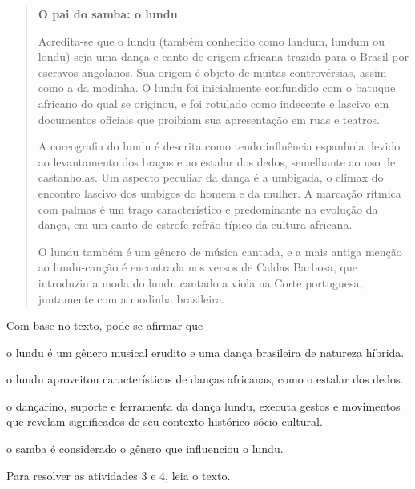 \begin{quote}
\textbf{O pai do samba: o lundu}

Acredita-se que o lundu (também conhecido como landum, lundum ou londu) seja uma dança e 
canto de origem africana trazida para o Brasil por escravos angolanos. Sua origem é 
objeto de muitas controvérsias, assim como a da modinha. O lundu foi inicialmente 
confundido com o batuque africano do qual se originou, e foi rotulado como indecente e 
lascivo em documentos oficiais que proibiam sua apresentação em ruas e teatros.

A coreografia do lundu é descrita como tendo influência espanhola devido ao levantamento 
dos braços e ao estalar dos dedos, semelhante ao uso de castanholas. Um aspecto peculiar 
da dança é a umbigada, o clímax do encontro lascivo dos umbigos do homem e da mulher. A 
marcação rítmica com palmas é um traço característico e predominante na evolução da 
dança, em um canto de estrofe-refrão típico da cultura africana.

O lundu também é um gênero de música cantada, e a mais antiga menção ao lundu-canção é 
encontrada nos versos de Caldas Barbosa, que introduziu a moda do lundu cantado a viola 
na Corte portuguesa, juntamente com a modinha brasileira.

\end{quote}

Com base no texto, pode-se afirmar que

\begin{escolha}
\item
  o lundu é um gênero musical erudito e uma dança brasileira de
  natureza híbrida.
\item
  o lundu aproveitou características de danças africanas, como o estalar
  dos dedos.
\item
  o dançarino, suporte e ferramenta da dança lundu, executa gestos e
  movimentos que revelam significados de seu contexto
  histórico-sócio-cultural. 
\item
  o samba é considerado o gênero que influenciou o lundu.
\end{escolha}

Para resolver as atividades 3 e 4, leia o texto.

